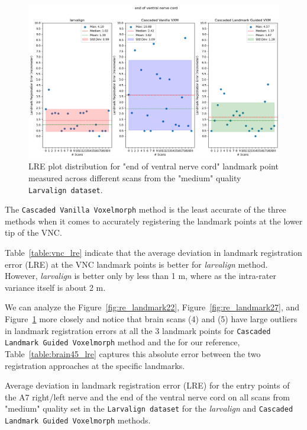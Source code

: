 \documentclass{book}
\begin{document}
	\begin{figure}[h!]
		\centering
		\includegraphics[width=0.9\columnwidth]{resources/chapter5_fresh/output/end of ventral nerve cord.png}
		\caption{LRE plot distribution for "end of ventral nerve cord" landmark point measured across different scans from the "medium" quality \texttt{Larvalign dataset}.}
		\label{fig:re_landmark15}
	\end{figure}
	
	The \texttt{Cascaded Vanilla Voxelmorph} method is the least accurate of the three methods when it comes to accurately registering the landmark points at the lower tip of the VNC.
	
	Table~\ref{table:vnc_lre} indicate that the average deviation in landmark registration error (LRE) at the VNC landmark points is better for \textit{larvalign} method. However, \emph{larvalign} is better only by less than 1 \textmu m, where as the intra-rater variance itself is about 2 \textmu m.
	
	We can analyze the Figure~\ref{fig:re_landmark22}, Figure~\ref{fig:re_landmark27}, and Figure~\ref{fig:re_landmark15} more closely and notice that brain scans (4) and (5) have large outliers in landmark registration errors at all the 3 landmark points for \texttt{Cascaded Landmark Guided Voxelmorph} method and the for our reference, Table~\ref{table:brain45_lre} captures this absolute error between the two registration approaches at the specific landmarks.
	
	\begin{table}[H]
		\centering
		
		\caption{Average deviation in landmark registration error (LRE) for the entry points of the A7 right/left nerve and the end of the ventral nerve cord on all scans from "medium" quality set in the \texttt{Larvalign dataset} for the \textit{larvalign} and \texttt{Cascaded Landmark Guided Voxelmorph} methods.}
		\label{table:vnc_lre}
	\end{table}
	
\end{document}
